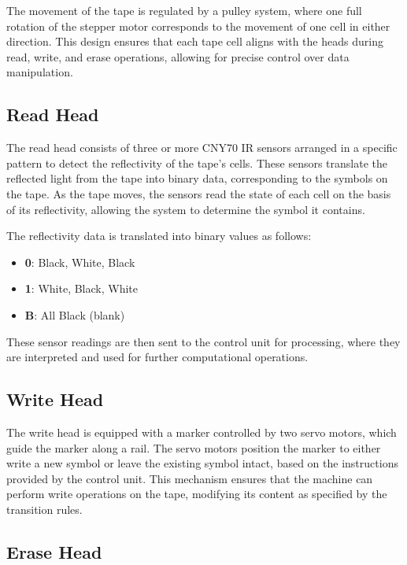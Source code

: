 The movement of the tape is regulated by a pulley system, where one full rotation of the stepper motor corresponds to the movement of one cell in either direction. This design ensures that each tape cell aligns with the heads during read, write, and erase operations, allowing for precise control over data manipulation.

\subsection{Read Head}

The read head consists of three or more CNY70 IR sensors arranged in a specific pattern to detect the reflectivity of the tape's cells. These sensors translate the reflected light from the tape into binary data, corresponding to the symbols on the tape. As the tape moves, the sensors read the state of each cell on the basis of its reflectivity, allowing the system to determine the symbol it contains.

The reflectivity data is translated into binary values as follows:

\begin{itemize}
    \item \textbf{0}: Black, White, Black
    \item \textbf{1}: White, Black, White
    \item \textbf{B}: All Black (blank)
\end{itemize}

These sensor readings are then sent to the control unit for processing, where they are interpreted and used for further computational operations.

\subsection{Write Head}

The write head is equipped with a marker controlled by two servo motors, which guide the marker along a rail. The servo motors position the marker to either write a new symbol or leave the existing symbol intact, based on the instructions provided by the control unit. This mechanism ensures that the machine can perform write operations on the tape, modifying its content as specified by the transition rules.

\subsection{Erase Head}

